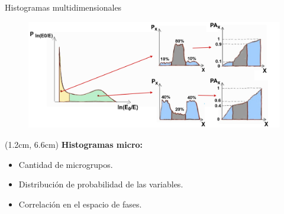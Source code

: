 \documentclass[aspectratio=169,english]{beamer}
\begin{document}
\begin{frame}[fragile]{Histogramas multidimensionales}
    \begin{figure}
        \centering
        \includegraphics[width=0.93\linewidth]{imagens/esquema4.png}
        \label{fig:esquema4}
    \end{figure}
    \begin{textblock*}{10cm}(1.2cm, 6.6cm) %
        \textbf{Histogramas micro:}
            \begin{itemize}
                \item Cantidad de microgrupos.
                \item Distribución de probabilidad de las variables.
                \item Correlación en el espacio de fases.
            \end{itemize} 
    \end{textblock*}




     

\end{frame}
\end{document}
